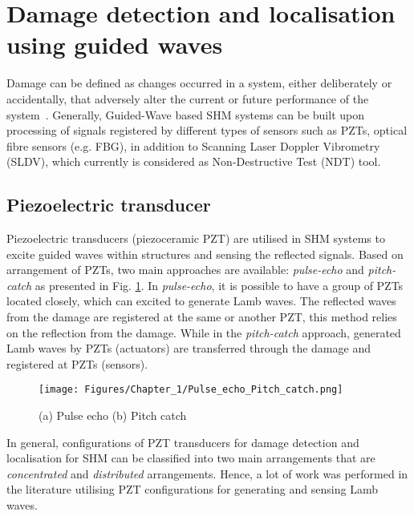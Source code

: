 \section[Damage identification]{Damage detection and localisation using guided waves}
\label{sec23}
Damage can be defined as changes occurred in a system, either deliberately or accidentally, that adversely alter the current or future performance of the system~\cite{Farrar2012}. 
Generally, Guided-Wave based SHM systems can be built upon processing of signals registered by different types of sensors such as PZTs, optical fibre sensors (e.g. FBG), in addition to Scanning Laser Doppler Vibrometry (SLDV), which currently is considered as Non-Destructive Test (NDT) tool.
\subsection{Piezoelectric transducer} 
Piezoelectric transducers (piezoceramic PZT) are utilised in SHM systems to excite guided waves within structures and sensing the reflected signals. 
Based on arrangement of PZTs, two main approaches are available: \emph{pulse-echo} and \emph{pitch-catch} as presented in Fig. \ref{fig:Pulse_echo_Pitch_catch}.
In \emph{pulse-echo}, it is possible to have a group of PZTs located closely, which can excited to generate Lamb waves. 
The reflected waves from the damage are registered at the same or another PZT, this method relies on the reflection from the damage. 
While in the \emph{pitch-catch} approach, generated Lamb waves by PZTs (actuators) are transferred through the damage and registered at PZTs (sensors).
\begin{figure}[!ht]
	\begin{center}
		\centering
		\texttt{[image: Figures/Chapter\_1/Pulse\_echo\_Pitch\_catch.png]}
	\end{center}
	\caption{(a) Pulse echo	(b) Pitch catch} 
	\label{fig:Pulse_echo_Pitch_catch}
\end{figure}
In general, configurations of PZT transducers for damage detection and localisation for SHM can be classified into two main arrangements that are \emph{concentrated} and \emph{distributed} arrangements. 
Hence, a lot of work was performed in the literature utilising PZT configurations for generating and sensing  Lamb waves.

